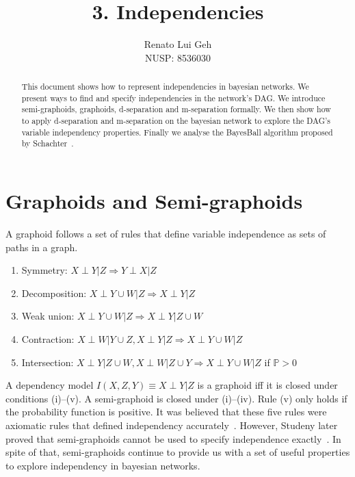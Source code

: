 \documentclass{amsart}
\title[]{3. Independencies}
\author[]{Renato Lui Geh\\NUSP\@: 8536030}
\theoremstyle{plain}
\newcommand{\pr}{\mathbb{P}}
\renewcommand{\implies}{\Rightarrow}
\begin{document}
\begin{abstract}
  This document shows how to represent independencies in bayesian networks. We present ways to find
  and specify independencies in the network's DAG\@. We introduce semi-graphoids, graphoids,
  d-separation and m-separation formally. We then show how to apply d-separation and m-separation
  on the bayesian network to explore the DAG's variable independency properties. Finally we analyse
  the BayesBall algorithm proposed by Schachter~\cite{bayesball}.

  \vspace*{-2.5em}
\end{abstract}

\maketitle

\section{Graphoids and Semi-graphoids}

A graphoid follows a set of rules that define variable independence as sets of paths in a graph.

\begin{enumerate}
  \item Symmetry: $X\perp Y|Z\implies Y\perp X|Z$
  \item Decomposition: $X\perp Y\cup W|Z\implies X\perp Y|Z$
  \item Weak union: $X\perp Y\cup W|Z\implies X\perp Y|Z\cup W$
  \item Contraction: $X\perp W|Y\cup Z, X\perp Y|Z\implies X\perp Y\cup W|Z$
  \item Intersection: $X\perp Y|Z\cup W, X\perp W|Z\cup Y\implies X\perp Y\cup W|Z$ if $\pr>0$
\end{enumerate}

A dependency model $I(X,Z,Y)\equiv X\perp Y|Z$ is a graphoid iff it is closed under conditions
(i)--(v). A semi-graphoid is closed under (i)--(iv). Rule (v) only holds if the probability
function is positive. It was believed that these five rules were axiomatic rules that defined
independency accurately~\cite{graphoids-pearl}. However, Studeny later proved that semi-graphoids
cannot be used to specify independence exactly~\cite{graphoids-studeny}. In spite of that,
semi-graphoids continue to provide us with a set of useful properties to explore independency in
bayesian networks.
\end{document}
